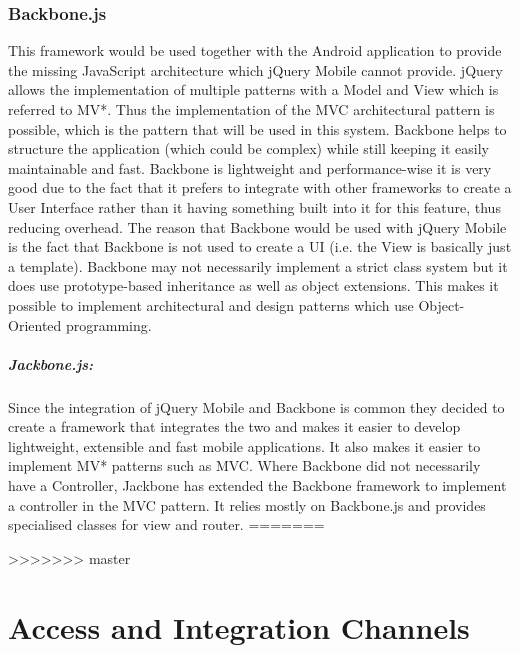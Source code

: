 \documentclass[a4paper,12pt]{article}
\begin{document}
\subsubsection{Backbone.js}
This framework would be used together with the Android application to provide the missing JavaScript architecture which jQuery Mobile cannot provide. jQuery allows the implementation of multiple patterns with a Model and View which is referred to MV*. Thus the implementation of the MVC architectural pattern is possible, which is the pattern that will be used in this system. Backbone helps to structure the application (which could be complex) while still keeping it easily maintainable and fast. Backbone is lightweight and performance-wise it is very good due to the fact that it prefers to integrate with other frameworks to create a User Interface rather than it having something built into it for this feature, thus reducing overhead. The reason that Backbone would be used with jQuery Mobile is the fact that Backbone is not used to create a UI (i.e. the View is basically just a template). Backbone may not necessarily implement a strict class system but it does use prototype-based inheritance as well as object extensions. This makes it possible to implement architectural and design patterns which use Object-Oriented programming. \\

\subparagraph{Jackbone.js:}
Since the integration of jQuery Mobile and Backbone is common they decided to create a framework that integrates the two and makes it easier to develop lightweight, extensible and fast mobile applications. It also makes it easier to implement MV* patterns such as MVC. Where Backbone did not necessarily have a Controller, Jackbone has extended the Backbone framework to implement a controller in the MVC pattern. It relies mostly on Backbone.js and provides specialised classes for view and router.
=======

>>>>>>> master
\section{Access and Integration Channels}

\end{document}
